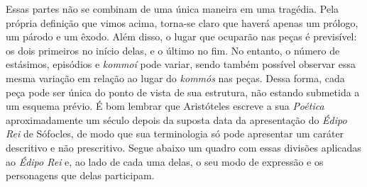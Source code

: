 Essas partes não se combinam de uma única maneira em uma tragédia. Pela
própria definição que vimos acima, torna-se claro que haverá apenas um
prólogo, um párodo e um êxodo. Além disso, o lugar que ocuparão nas
peças é previsível: os dois primeiros no início delas, e o último no
fim. No entanto, o número de estásimos, episódios e \emph{kommoí} pode
variar, sendo também possível observar essa mesma variação em relação ao
lugar do \emph{kommós} nas peças. Dessa forma, cada peça pode ser única
do ponto de vista de sua estrutura, não estando submetida a um esquema
prévio. É bom lembrar que Aristóteles escreve a sua \emph{Poética}
aproximadamente um século depois da suposta data da apresentação do
\emph{Édipo Rei} de Sófocles, de modo que sua terminologia só pode
apresentar um caráter descritivo e não prescritivo. Segue abaixo um
quadro com essas divisões aplicadas ao \emph{Édipo Rei} e, ao lado de
cada uma delas, o seu modo de expressão e os personagens que delas
participam.

